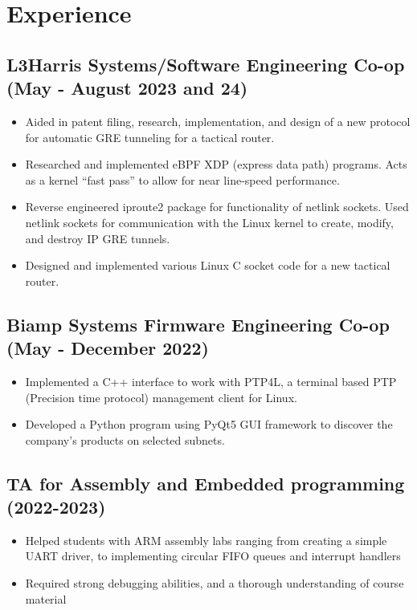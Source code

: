 \documentclass{article}
\begin{document}
\section{Experience}
    \subsection{L3Harris Systems/Software Engineering Co-op \hfill (May -
    August 2023 and 24)}
        \begin{itemize}[noitemsep]
            \item Aided in patent filing, research, implementation, and design
                of a new protocol for automatic GRE tunneling for a tactical router.
            \item Researched and implemented eBPF XDP (express data path)
                programs. Acts as a kernel ``fast pass'' to allow for near
                line-speed performance.
            \item Reverse engineered iproute2 package for functionality of
                netlink sockets. Used netlink sockets for communication with the
                Linux kernel to create, modify, and destroy IP GRE tunnels.
            \item Designed and implemented various Linux C socket code for a new tactical
                router.
        \end{itemize}

    \subsection{Biamp Systems Firmware Engineering Co-op \hfill (May - December 2022)}
        \begin{itemize}[noitemsep]
            \item Implemented a C++ interface to work with PTP4L, a terminal based 
                PTP (Precision time protocol) management client for Linux.  
            \item Developed a Python program using PyQt5 GUI framework to
                discover the company's products on selected subnets.
        \end{itemize}

    \subsection{TA for Assembly and Embedded programming \hfill (2022-2023)}
    \begin{itemize}[noitemsep]
        \item Helped students with ARM assembly labs ranging from creating 
            a simple UART driver, to implementing circular FIFO queues and
            interrupt handlers
        \item Required strong debugging abilities, and a thorough understanding of 
            course material
    \end{itemize}
\end{document}
